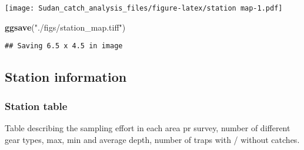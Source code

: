 \documentclass[]{article}
\newenvironment{Shaded}{\begin{snugshade}}{\end{snugshade}}
\newcommand{\KeywordTok}[1]{\textcolor[rgb]{0.13,0.29,0.53}{\textbf{#1}}}
\newcommand{\StringTok}[1]{\textcolor[rgb]{0.31,0.60,0.02}{#1}}
\newcommand{\NormalTok}[1]{#1}
\begin{document}
\texttt{[image: Sudan\_catch\_analysis\_files/figure-latex/station map-1.pdf]}

\begin{Shaded}
\begin{Highlighting}[]
\KeywordTok{ggsave}\NormalTok{(}\StringTok{"./figs/station_map.tiff"}\NormalTok{)}
\end{Highlighting}
\end{Shaded}

\begin{verbatim}
## Saving 6.5 x 4.5 in image
\end{verbatim}

\subsection{Station information}\label{station-information}

\subsubsection{Station table}\label{station-table}

Table describing the sampling effort in each area pr survey, number of
different gear types, max, min and average depth, number of traps with /
without catches.
\end{document}
